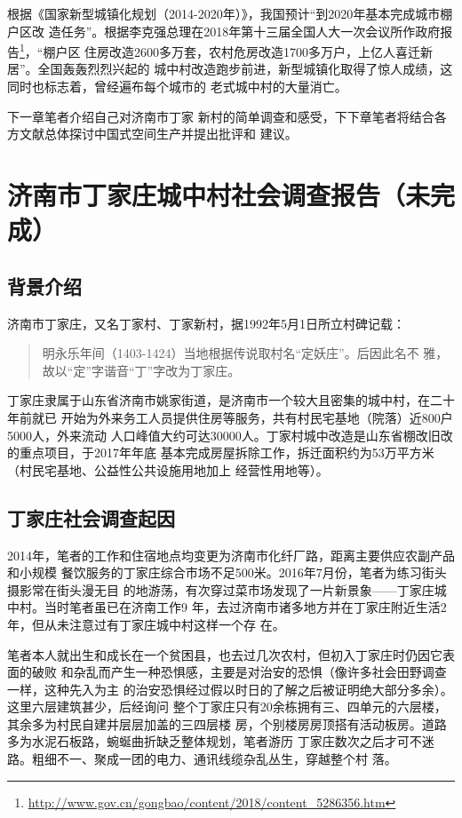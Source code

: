根据《国家新型城镇化规划（2014-2020年）》，我国预计“到2020年基本完成城市棚户区改
造任务”。根据李克强总理在2018年第十三届全国人大一次会议所作政府报
告\footnote{\url{http://www.gov.cn/gongbao/content/2018/content_5286356.htm}}，“棚户区
住房改造2600多万套，农村危房改造1700多万户，上亿人喜迁新居”。全国轰轰烈烈兴起的
城中村改造跑步前进，新型城镇化取得了惊人成绩，这同时也标志着，曾经遍布每个城市的
老式城中村的大量消亡。

下一章笔者介绍自己对济南市丁家
新村的简单调查和感受，下下章笔者将结合各方文献总体探讨中国式空间生产并提出批评和
建议。


\chapter{济南市丁家庄城中村社会调查报告（未完成）}

\section{背景介绍}

济南市丁家庄，又名丁家村、丁家新村，据1992年5月1日所立村碑记载：
\begin{quotation}明永乐年间（1403-1424）当地根据传说取村名“定妖庄”。后因此名不
雅，故以“定”字谐音“丁”字改为丁家庄。
\end{quotation}

丁家庄隶属于山东省济南市姚家街道，是济南市一个较大且密集的城中村，在二十年前就已
开始为外来务工人员提供住房等服务，共有村民宅基地（院落）近800户5000人，外来流动
人口峰值大约可达30000人。丁家村城中改造是山东省棚改旧改的重点项目，于2017年年底
基本完成房屋拆除工作，拆迁面积约为53万平方米（村民宅基地、公益性公共设施用地加上
经营性用地等）。

\section{丁家庄社会调查起因}

2014年，笔者的工作和住宿地点均变更为济南市化纤厂路，距离主要供应农副产品和小规模
餐饮服务的丁家庄综合市场不足500米。2016年7月份，笔者为练习街头摄影常在街头漫无目
的地游荡，有次穿过菜市场发现了一片新景象——丁家庄城中村。当时笔者虽已在济南工作9
年，去过济南市诸多地方并在丁家庄附近生活2年，但从未注意过有丁家庄城中村这样一个存
在。


笔者本人就出生和成长在一个贫困县，也去过几次农村，但初入丁家庄时仍因它表面的破败
和杂乱而产生一种恐惧感，主要是对治安的恐惧（像许多社会田野调查一样，这种先入为主
的治安恐惧经过假以时日的了解之后被证明绝大部分多余）。这里六层建筑甚少，后经询问
整个丁家庄只有20余栋拥有三、四单元的六层楼，其余多为村民自建并层层加盖的三四层楼
房，个别楼房房顶搭有活动板房。道路多为水泥石板路，蜿蜒曲折缺乏整体规划，笔者游历
丁家庄数次之后才可不迷路。粗细不一、聚成一团的电力、通讯线缆杂乱丛生，穿越整个村
落。


